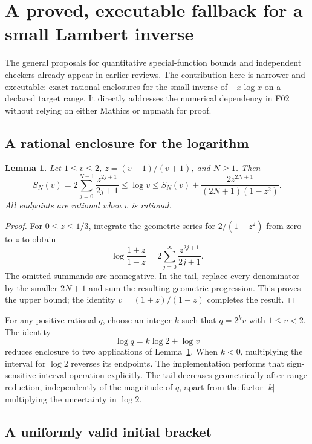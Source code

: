 \documentclass[11pt,letterpaper]{article}
\newtheorem{lemma}[proposition]{Lemma}
\begin{document}
\section{A proved, executable fallback for a small Lambert inverse}\label{sec:certificate}

The general proposals for quantitative special-function bounds and independent checkers already appear in earlier reviews. The contribution here is narrower and executable: exact rational enclosures for the small inverse of $-x\log x$ on a declared target range. It directly addresses the numerical dependency in F02 without relying on either Mathics or mpmath for proof.\cite{review-status}

\subsection{A rational enclosure for the logarithm}

\begin{lemma}\label{lem:log}
Let $1\le v\le2$, $z=(v-1)/(v+1)$, and $N\ge1$. Then
\[
 S_N(v)=2\sum_{j=0}^{N-1}\frac{z^{2j+1}}{2j+1}
 \le \log v
 \le S_N(v)+\frac{2z^{2N+1}}{(2N+1)(1-z^2)}.
\]
All endpoints are rational when $v$ is rational.
\end{lemma}
\begin{proof}
For $0\le z\le1/3$, integrate the geometric series for $2/(1-z^2)$ from zero to $z$ to obtain
\[
 \log\frac{1+z}{1-z}
 =2\sum_{j=0}^\infty\frac{z^{2j+1}}{2j+1}.
\]
The omitted summands are nonnegative. In the tail, replace every denominator by the smaller $2N+1$ and sum the resulting geometric progression. This proves the upper bound; the identity $v=(1+z)/(1-z)$ completes the result.
\end{proof}

For any positive rational $q$, choose an integer $k$ such that $q=2^k v$ with $1\le v<2$. The identity
\[
 \log q=k\log2+\log v
\]
reduces enclosure to two applications of Lemma~\ref{lem:log}. When $k<0$, multiplying the interval for $\log2$ reverses its endpoints. The implementation performs that sign-sensitive interval operation explicitly. The tail decreases geometrically after range reduction, independently of the magnitude of $q$, apart from the factor $|k|$ multiplying the uncertainty in $\log2$.

\subsection{A uniformly valid initial bracket}
\end{document}
